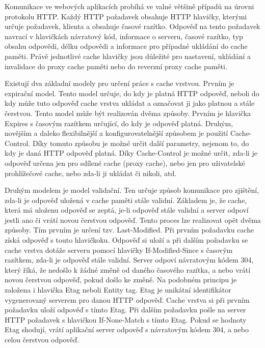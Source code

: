 \documentclass[12pt]{article}
\begin{document}
\obrazek
{}

\label{sec:http-headers}
Komunikace ve webových aplikacích probíhá ve valné většině případů na úrovni protokolu HTTP. Každý HTTP požadavek obsahuje HTTP hlavičky, kterými určuje požadavek, klienta a obsahuje časové razítko. Odpověď na tento požadavek navrací v hlavičkách návratový kód, informace o serveru, časové razítko, typ obsahu odpovědi, délku odpovědi a informace pro případné ukládání do cache paměti. Právě jednotlivé cache hlavičky jsou důležité pro nastavení, ukládání a invalidace do proxy cache paměti nebo do reverzní proxy cache paměti.

Existují dva základní modely pro určení práce s cache vrstvou. Prvním je expirační model. Tento model určuje, do kdy je platná HTTP odpověď, neboli do kdy může tuto odpověď cache vrstva ukládat a označovat ji jako platnou a stále čerstvou. Tento model může být realizován dvěma způsoby. Prvním je hlavička Expires s časovým razítkem určující, do kdy je odpověď platná. Druhým, novějším a daleko flexibilnější a konfigurovatelnější způsobem je použití Cache-Control. Díky tomuto způsobu je možné určit další parametry, nejenom to, do kdy je daná HTTP odpověď platná. Díky Cache-Control je možné určit, zda-li je odpověď určena jen pro sdílené cache (proxy cache), nebo jen pro uživatelské prohlížečové cache, nebo zda-li ji ukládat či nikoli, atd.\cite{rfc-http}

Druhým modelem je model validační. Ten určuje způsob komunikace pro zjištění, zda-li je odpověď uložená v cache paměti stále validní. Základem je, že cache, která má uloženu odpověď se zeptá, je-li odpověď stále validní a server odpoví jestli ano či vrátí novou čerstvou odpověď. Tento proces lze realizovat opět dvěma způsoby. Tím prvním je určení tzv. Last-Modified. Při prvním požadavku cache získá odpověď s touto hlavičkoku. Odpověď si uloží a při dalším požadavku se cache vrstva dotáže serveru pomocí hlavičky If-Modified-Since s časovým razítkem, zda-li je odpověď stále validní. Server odpoví návratovým kódem 304, který říká, že nedošlo k žádné změně od daného časového razítka, a nebo vrátí novou čerstvou odpověď, pokud došlo ke změně. Na podobném principu je založena i hlavička Etag neboli Entity tag. Etag je unikátní identifikátor vygenerovaný serverem pro danou HTTP odpověď. Cache vrstva si při prvním požadavku uloží odpověď s tímto Etag. Při dalším požadavku pošle na server HTTP požadavek s hlavičkou If-None-Match s tímto Etag. Pokud se hodnoty Etag shodují, vrátí aplikační server odpověď s návratovým kódem 304, a nebo celou čerstvou odpověď.\cite{rfc-http}
\end{document}
